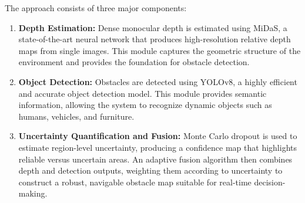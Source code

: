 \documentclass[12pt,oneside]{book}
\begin{document}
The approach consists of three major components:
\begin{enumerate}
    \item \textbf{Depth Estimation:} Dense monocular depth is estimated using MiDaS, a state-of-the-art neural network that produces high-resolution relative depth maps from single images. This module captures the geometric structure of the environment and provides the foundation for obstacle detection.
    \item \textbf{Object Detection:} Obstacles are detected using YOLOv8, a highly efficient and accurate object detection model. This module provides semantic information, allowing the system to recognize dynamic objects such as humans, vehicles, and furniture.
    \item \textbf{Uncertainty Quantification and Fusion:} Monte Carlo dropout is used to estimate region-level uncertainty, producing a confidence map that highlights reliable versus uncertain areas. An adaptive fusion algorithm then combines depth and detection outputs, weighting them according to uncertainty to construct a robust, navigable obstacle map suitable for real-time decision-making.
\end{enumerate}
\end{document}
